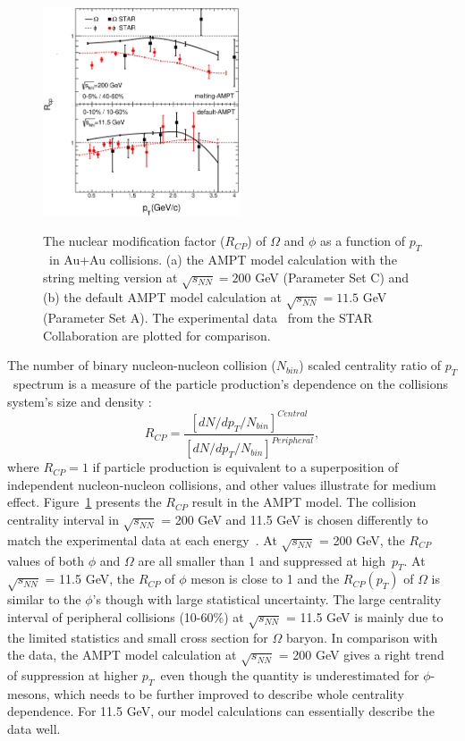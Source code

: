\documentclass[twocolumn,aps,prc,showpacs,superscriptaddress,preprintnumbers,floatfix,nofootinbib]{revtex4}
\newcommand{ \pt } {${p_{T}}$}
\begin{document}
\begin{CJK*}{GBK}{song}
\begin{figure}[htbp]
\includegraphics[width=0.52\textwidth]{Fig5_Rcp.eps}\\
\caption{The nuclear modification factor ($R_{CP}$) of $\Omega$ and $\phi$ as a function of \pt~in Au+Au collisions. (a) the AMPT model calculation with the string melting version at $\sqrt{s_{NN}} =  200$ GeV (Parameter Set C) and (b) the default AMPT model calculation at $\sqrt{s_{NN}} = 11.5$ GeV (Parameter Set A).  The experimental data~\cite{OmegaphiSTAR,star_phi} from the STAR Collaboration are plotted for comparison. }
\label{RCP}
\end{figure}

The number of binary nucleon-nucleon collision ($N_{bin}$) scaled centrality ratio of \pt~spectrum is a measure of the particle production's dependence on the collisions system's size and density \cite{STAR_Rcp}:
    \begin{equation}
        R_{CP}=\frac{[dN/dp_{T}/N_{bin}]^{Central}} {[dN/dp_{T}/N_{bin}]^{Peripheral}},
        \label{eq10}
    \end{equation}
 where $R_{CP}=1$ if particle production is equivalent to a superposition of independent nucleon-nucleon collisions, and other values illustrate for medium effect. Figure~\ref{RCP} presents the $R_{CP}$ result in the AMPT model. The collision centrality interval in $\sqrt{s_{NN}}$ = 200 GeV and 11.5 GeV is chosen differently to match the experimental data at each energy~\cite{OmegaphiSTAR,star_phi}. At $\sqrt{s_{NN}}$ = 200 GeV, the $R_{CP}$ values of both $\phi$ and $\Omega$ are all smaller than 1 and suppressed at high~\pt. At $\sqrt{s_{NN}}$ = 11.5 GeV, the $R_{CP}$ of $\phi$ meson is close to 1 and  the $R_{CP}(p_T)$ of $\Omega$ is similar to the $\phi$'s though with large statistical uncertainty. The large centrality interval of peripheral collisions (10-60\%) at $\sqrt{s_{NN}}$ = 11.5 GeV is mainly due to the limited statistics and small cross section for $\Omega$ baryon. In comparison with the data, the AMPT model calculation at $\sqrt{s_{NN}}$ = 200 GeV gives a right trend of suppression at higher \pt~even though the quantity is underestimated for $\phi$-mesons, which needs to be further improved to describe whole centrality dependence. For 11.5 GeV, our model calculations can essentially describe the data well.



\end{CJK*}
\end{document}
